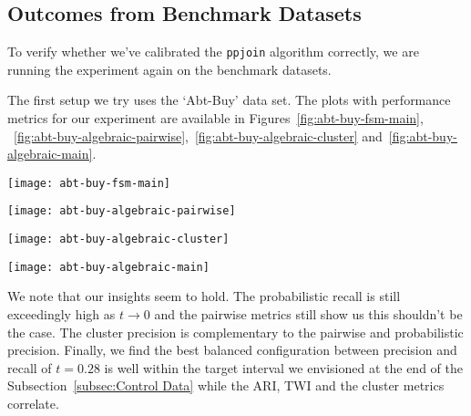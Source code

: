 \subsection{Outcomes from Benchmark Datasets}\label{subsec:Benchmark Datasets}

To verify whether we've calibrated the \texttt{ppjoin} algorithm correctly,
we are running the experiment again on the benchmark datasets.

The first setup we try uses the `Abt-Buy' data set.
The plots with performance metrics for our experiment are available in Figures~\ref{fig:abt-buy-fsm-main},
~\ref{fig:abt-buy-algebraic-pairwise},~\ref{fig:abt-buy-algebraic-cluster}
and~\ref{fig:abt-buy-algebraic-main}.

\begin{figure*}[htbp]
    \begin{minipage}{0.24\textwidth}
        \centering
        \texttt{[image: abt-buy-fsm-main]}
        \caption{Abt-Buy statistical metrics.}\label{fig:abt-buy-fsm-main}
    \end{minipage}
    \begin{minipage}{0.24\textwidth}
        \centering
        \texttt{[image: abt-buy-algebraic-pairwise]}
        \caption{Abt-Buy pairwise metrics.}\label{fig:abt-buy-algebraic-pairwise}
    \end{minipage}
    \begin{minipage}{0.24\textwidth}
        \centering
        \texttt{[image: abt-buy-algebraic-cluster]}
        \caption{Abt-Buy cluster metrics.}\label{fig:abt-buy-algebraic-cluster}
    \end{minipage}
    \begin{minipage}{0.24\textwidth}
        \centering
        \texttt{[image: abt-buy-algebraic-main]}
        \caption{Abt-Buy clustering indexes.}\label{fig:abt-buy-algebraic-main}
    \end{minipage}
\end{figure*}\label{abt-buy}

We note that our insights seem to hold.
The probabilistic recall is still exceedingly high as $t\to0$ and the pairwise
metrics still show us this shouldn't be the case.
The cluster precision is complementary to the pairwise and probabilistic
precision.
Finally, we find the best balanced configuration between precision and recall of
$t=0.28$ is well within the target interval we envisioned at the end of the
Subsection~\ref{subsec:Control Data} while the ARI, TWI and the cluster metrics correlate.


